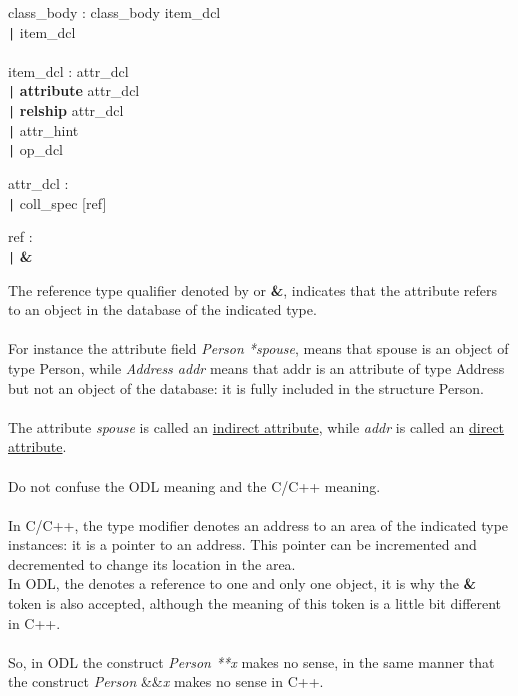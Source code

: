 \begin{tabbing}
\grindent
class\_body \> : class\_body item\_dcl\\
\> \texttt{|} item\_dcl\\
\\
item\_dcl \> : attr\_dcl\\
\> \texttt{|} {\bf attribute} attr\_dcl\\
\> \texttt{|} {\bf relship} attr\_dcl\\
\> \texttt{|} attr\_hint\\
\> \texttt{|} op\_dcl
\end{tabbing}


\begin{tabbing}
\grindent
attr\_dcl \> : \ident [ref] \ident [array] [inverse] {\bf ;}\\
\> \texttt{|} coll\_spec [ref] \ident [array] [inverse] {\bf ;}
\end{tabbing}

\begin{tabbing}
\grindent
ref \> : {\bf *}\\
\> \texttt{|} {\bf \&}
\end{tabbing}
The reference type qualifier denoted by {\bf *} or {\bf \&}, indicates that the
attribute refers to an object in the database of the indicated type.
\\
\\
For instance the attribute field \emph{Person *spouse}, means that spouse
is an object of type Person, while \emph{Address addr} means that addr
is an attribute of type Address but not an object of the database: it is
fully included in the structure Person.
\\
\\
The attribute \emph{spouse} is called an \underline{indirect attribute},
while \emph{addr} is called an \underline{direct attribute}.
\\
\\
Do not confuse the {\bf *} ODL meaning and the {\bf *} C/C++ meaning.
\\
\\
In C/C++, the {\bf *} type modifier denotes an address to an area of the
indicated type instances: it is a pointer to an address. This pointer
can be incremented and decremented to change its location in the area.
\\
In ODL, the {\bf *} denotes a reference to one and only one object, it is why
the {\bf \&} token is also accepted, although the meaning of this token
is a little bit different in C++.
\\
\\
So, in ODL the construct \emph{Person **x} makes no sense, in the same
manner that the construct \emph{Person} \&\&\emph{x} makes no sense in C++.



